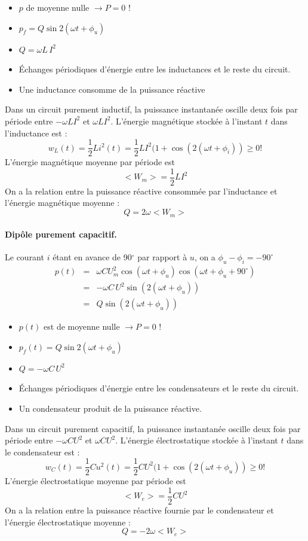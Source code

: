 \begin{itemize}
\item $p$ de moyenne nulle $\rightarrow P=0$ !
\item $p_f= Q \sin 2(\omega t+ \phi_u)$
\item $Q=\omega L\, I^2$
\item Échanges périodiques d'énergie entre les inductances et le reste du circuit.
\item Une inductance consomme de la puissance réactive  
\end{itemize}
Dans un circuit purement inductif, la puissance instantanée oscille
deux fois par période entre $-\omega L I^2$ et $\omega L I^2$.
L'énergie magnétique stockée à l'instant $t$ dans l'inductance est :
\[w_L(t)= \frac{1}{2}Li^2(t)=\frac{1}{2} L I^2(1+\cos (2(\omega
t + \phi_i)) \geq 0 !\]
L'énergie magnétique moyenne par période est
\[<W_m>=\frac{1}{2}LI^2\]
On a la relation entre la puissance réactive consommée par
l'inductance et l'énergie magnétique
moyenne : 
\[ Q = 2\omega <W_m>\]
		
\paragraph{Dipôle purement capacitif.}
Le courant $i$ étant en avance de 90$^{\circ}$ par rapport à $u$, on a 
$\phi_u-\phi_i=-90^{\circ}$
\begin{eqnarray*}
	p(t)& = &\omega C U_m^2 \cos(\omega t+\phi_u)\cos (\omega
	t+\phi_u + 90^{\circ})\\
	& = & -\omega C\, U^2 \sin (2(\omega t + \phi_u))\\
	& = & Q \sin (2(\omega t + \phi_u))
\end{eqnarray*}
\begin{itemize}
\item $p(t)$ est de moyenne nulle  $\rightarrow P=0$ !
\item $p_f(t)= Q \sin 2(\omega t+ \phi_u)$
\item $Q=-\omega C\, U^2$
\item Échanges périodiques d'énergie entre les condensateurs et le reste du circuit.
\item Un condensateur produit de la puissance réactive.
\end{itemize}
Dans un circuit purement capacitif, la puissance instantanée oscille
deux fois par période entre $-\omega C U^2$ et $\omega C U^2$.
L'énergie électrostatique  stockée à l'instant $t$ dans le condensateur est :
\[w_C(t)= \frac{1}{2}Cu^2(t)=\frac{1}{2} C U^2(1+\cos (2(\omega
t + \phi_u)) \geq 0 !\]
L'énergie électrostatique  moyenne par période est
\[<W_e>=\frac{1}{2}CU^2\]
On a la relation entre la puissance réactive fournie par le condensateur
et l'énergie électrostatique moyenne :
\[ Q = - 2\omega <W_e>\]


